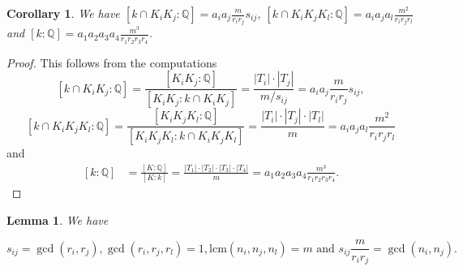 \documentclass[12pt,a4paper]{article}
\newtheorem{lemma}[theorem]{Lemma}
\newtheorem{cor}[theorem]{Corollary}
\theoremstyle{definition}
\newcommand{\Q}{\mathbb{Q}}
\newcommand{\lcm}{\mathrm{lcm}}
\begin{document}
\begin{cor}\label{compcap}
We have $[k\cap K_iK_j:\Q]=a_ia_j\frac{m}{r_ir_j}s_{ij}$, $[k\cap K_iK_jK_l:\Q]=a_ia_ja_l\frac{m^2}{r_ir_jr_l}$ and $[k:\Q]=a_1a_2a_3a_4\frac{m^3}{r_1r_2r_3r_4}$.
\end{cor}
\begin{proof}
This follows from the computations
$$[k\cap K_iK_j:\Q]=\frac{[K_iK_j:\Q]}{[K_iK_j:k\cap K_iK_j]}=\frac{|T_i|\cdot|T_j|}{m/s_{ij}}=a_ia_j\frac{m}{r_ir_j}s_{ij},$$
$$[k\cap K_iK_jK_l:\Q]=\frac{[K_iK_jK_l:\Q]}{[K_iK_jK_l:k\cap K_iK_jK_l]}=\frac{|T_i|\cdot|T_j|\cdot|T_l|}{m}=a_ia_ja_l\frac{m^2}{r_ir_jr_l}$$
and
\begin{equation*}
\begin{split}
[k:\Q]&=\frac{[K:\Q]}{[K:k]}=\frac{|T_1|\cdot|T_2|\cdot|T_3|\cdot|T_4|}{m}=
a_1a_2a_3a_4\frac{m^3}{r_1r_2r_3r_4}.
\end{split}
\end{equation*}

\end{proof}
\begin{lemma}\label{coprime}
We have 

$$s_{ij}=\gcd(r_i,r_j), \gcd(r_i,r_j,r_l)=1, \lcm\left(n_i,n_j,n_l\right)=m \text{ and } s_{ij}\frac{m}{r_ir_j}=\gcd(n_i,n_j).$$ %
\end{lemma}
\end{document}
